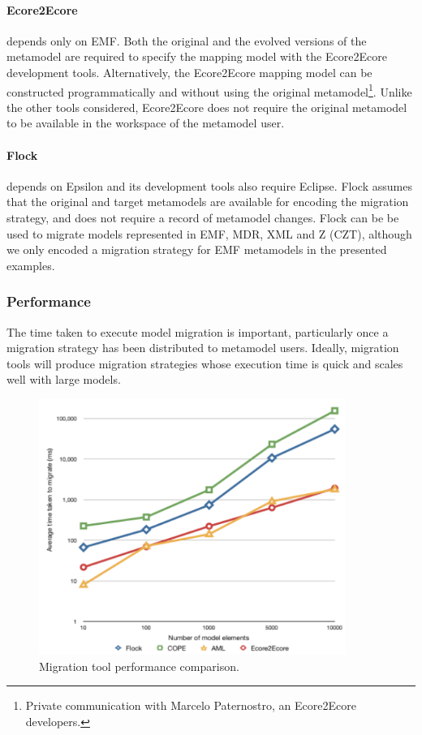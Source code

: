 \paragraph{Ecore2Ecore} depends only on EMF. Both the original and the evolved versions of the metamodel are required to specify the mapping model with the Ecore2Ecore development tools. Alternatively, the Ecore2Ecore mapping model can be constructed programmatically and without using the original metamodel\footnote{Private communication with Marcelo Paternostro, an Ecore2Ecore developers.}. Unlike the other tools considered, Ecore2Ecore does not require the original metamodel to be available in the workspace of the metamodel user.

\paragraph{Flock} depends on Epsilon and its development tools also require Eclipse. Flock assumes that the original and target metamodels are available for encoding the migration strategy, and does not require a record of metamodel changes. Flock can be be used to migrate models represented in EMF, MDR, XML and Z (CZT), although we only encoded a migration strategy for EMF metamodels in the presented examples.


\subsubsection{Performance}
The time taken to execute model migration is important, particularly once a migration strategy has been distributed to metamodel users. Ideally, migration tools will produce migration strategies whose execution time is quick and scales well with large models.

\begin{figure}[htbp]
	\centering
	\includegraphics[width=10cm]{6.Evaluation/images/migration_tool_performance.pdf}
	\caption{Migration tool performance comparison.}
	\label{fig:performance}
\end{figure}

